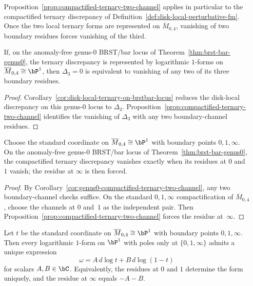 \begin{remark}
Proposition~\ref{prop:compactified-ternary-two-channel} applies in
particular to the compactified ternary discrepancy of
Definition~\ref{def:disk-local-perturbative-fm}. Once the two local
ternary forms are represented on $\overline{M}_{0,4}$, vanishing of
two boundary residues forces vanishing of the third.
\end{remark}

\begin{corollary}
\label{cor:genus0-compactified-ternary-two-channel}
If, on the anomaly-free genus-$0$ BRST/bar locus of
Theorem~\ref{thm:brst-bar-genus0}, the ternary discrepancy is
represented by logarithmic \(1\)-forms on
$\overline{M}_{0,4} \cong \bP^1$, then \(\Delta_3=0\) is equivalent
to vanishing of any two of its three boundary residues.
\end{corollary}

\begin{proof}
Corollary~\ref{cor:disk-local-ternary-on-brstbar-locus} reduces the
disk-local discrepancy on this genus-$0$ locus to \(\Delta_3\).
Proposition~\ref{prop:compactified-ternary-two-channel} identifies the
vanishing of \(\Delta_3\) with any two boundary-channel residues.
\end{proof}

\begin{corollary}
\label{cor:genus0-standard-chart-two-residues}
Choose the standard coordinate on
$\overline{M}_{0,4} \cong \bP^1$ with boundary points
$0,1,\infty$. On the anomaly-free genus-$0$ BRST/bar locus of
Theorem~\ref{thm:brst-bar-genus0}, the compactified ternary discrepancy
vanishes exactly when its residues at $0$ and~$1$ vanish; the residue at
$\infty$ is then forced.
\end{corollary}

\begin{proof}
By Corollary~\ref{cor:genus0-compactified-ternary-two-channel}, any two
boundary-channel checks suffice. On the standard
$0,1,\infty$ compactification of $\overline{M}_{0,4}$, choose
the channels at $0$ and~$1$ as the independent pair. Then
Proposition~\ref{prop:compactified-ternary-two-channel} forces the
residue at~$\infty$.
\end{proof}

\begin{proposition}
\label{prop:m04-standard-log-basis}
Let $t$ be the standard coordinate on
$\overline{M}_{0,4} \cong \bP^1$ with boundary points
$0,1,\infty$. Then every logarithmic $1$-form on
$\bP^1$ with poles only at $\{0,1,\infty\}$ admits a unique
expression
\[
\omega = A\, d\log t + B\, d\log(1-t)
\]
for scalars $A,B \in \bC$.
Equivalently, the residues at $0$ and $1$ determine the form
uniquely, and the residue at $\infty$ equals $-A-B$.
\end{proposition}


